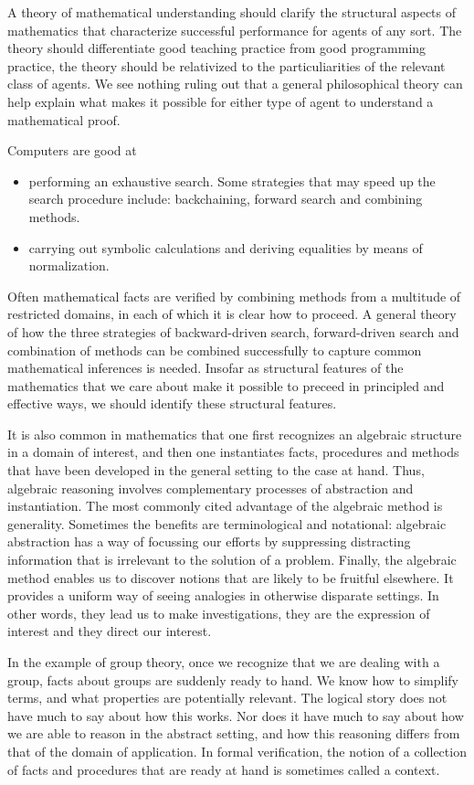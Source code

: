 \documentclass{article}
\begin{document}
A theory of mathematical understanding should clarify the structural aspects of
mathematics that characterize successful performance for agents of any sort.
The theory should differentiate good teaching practice from good programming
practice, the theory should be relativized to the particuliarities of the relevant
class of agents. We see nothing ruling out that a general philosophical theory
can help explain what makes it possible for either type of agent to understand
a mathematical proof.

Computers are good at
\begin{itemize}
\item performing an exhaustive search. Some strategies that may speed up the 
search procedure include: backchaining, forward search and combining methods.
\item carrying out symbolic calculations and deriving equalities by means of 
normalization.
\end{itemize} 
Often mathematical facts are verified by combining methods from a multitude of
restricted domains, in each of which it is clear how to proceed. A general
theory of how the three strategies of backward-driven search, forward-driven
search and combination of methods can be combined successfully to capture common
mathematical inferences is needed. Insofar as structural features of the
mathematics that we care about make it possible to preceed in principled and 
effective ways, we should identify these structural features.

It is also common in mathematics that one first recognizes an algebraic 
structure in a domain of interest, and then one instantiates facts, procedures
and methods that have been developed in the general setting to the case at hand.
Thus, algebraic reasoning involves complementary processes of abstraction and
instantiation. The most commonly cited advantage of the algebraic method is
generality. Sometimes the benefits are terminological and notational: algebraic
abstraction has a way of focussing our efforts by suppressing distracting
information that is irrelevant to the solution of a problem. Finally, the
algebraic method enables us to discover notions that are likely to be fruitful
elsewhere. It provides a uniform way of seeing analogies in otherwise disparate
settings. In other words, they lead us to make investigations, they are the
expression of interest and they direct our interest.

In the example of group theory, once we recognize that we are dealing with a
group, facts about groups are suddenly ready to hand. We know how to simplify
terms, and what properties are potentially relevant. The logical story does
not have much to say about how this works. Nor does it have much to say about
how we are able to reason in the abstract setting, and how this reasoning differs
from that of the domain of application. In formal verification, the notion of
a collection of facts and procedures that are ready at hand is sometimes called
a context.
\end{document}
